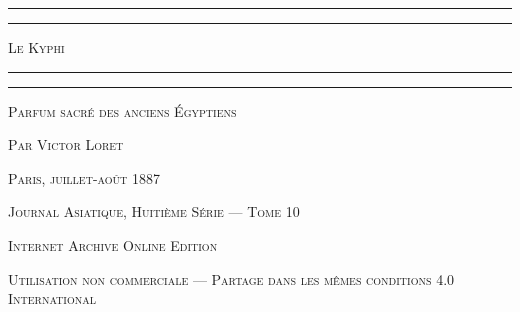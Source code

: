 \documentclass[a4paper, 11pt, oneside]{article}
\begin{document}
\begin{titlepage} %
	\centering %

	
	\rule{\textwidth}{1.6pt}\vspace*{-\baselineskip}\vspace*{2pt} %
	\rule{\textwidth}{0.4pt} %
	
	\vspace{1\baselineskip} %

	{\scshape\Huge Le Kyphi}
	
	\vspace{1\baselineskip} %

	\rule{\textwidth}{0.4pt}\vspace*{-\baselineskip}\vspace{3.2pt} %
	\rule{\textwidth}{1.6pt} %
	
	\vspace{1\baselineskip} %
	
	
	{\scshape Parfum sacré des anciens Égyptiens} %
	
	\vspace*{1\baselineskip} %
	
        {\scshape Par \Large Victor Loret} %
    
        \vspace*{\fill}

	\vspace{1\baselineskip}

	{\small\scshape Paris, juillet-août 1887}
	
	{\small\scshape{Journal Asiatique, Huitième Série --- Tome 10}}
	
	\vspace{0.5\baselineskip} %

        \scshape Internet Archive Online Edition  %
	
	{\scshape\small Utilisation non commerciale --- Partage dans les mêmes conditions 4.0 International} %
\end{titlepage}
\setlength{\parskip}{1mm plus1mm minus1mm}
\clearpage
\tableofcontents
\clearpage
\end{document}
